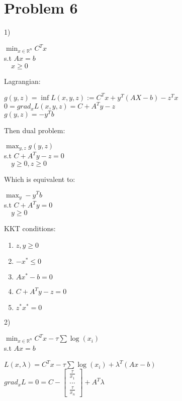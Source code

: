 \documentclass{article}
\begin{document}
\section{Problem 6}

1)
\begin{center}
$\displaystyle \min_{x\in \mathbb{R}^n} C^Tx$\\
s.t $Ax=b$\\
$\quad x \geq 0$ 
\end{center}
\vspace{5mm}
Lagrangian:
\begin{center}
$g(y,z) = \inf L(x,y,z) := C^Tx + y^T(AX-b) - z^Tx$\\
$0 = grad_x L(x,y,z) = C+A^Ty-z$\\
$g(y,z) = - y^Tb $\\
\end{center}
Then dual problem:
\begin{center}
$\displaystyle \max_{y,z} g(y,z)$\\
s.t $C+A^Ty-z=0$\\
$\quad y\geq 0, z \geq 0$
\end{center}
Which is equivalent to:
\begin{center}
$\displaystyle \max_{y} -y^Tb$\\
s.t $C+A^Ty=0$\\
$\quad y\geq 0$
\end{center}
KKT conditions:
\begin{enumerate}
\item $z,y \geq 0$
\item $-x^* \leq 0$
\item $Ax^*-b = 0$
\item $C + A^Ty-z=0$
\item $z^*x^* = 0$
\end{enumerate}


2)
\begin{center}
$\displaystyle \min_{x\in \mathbb{R}^n} C^Tx - \tau \sum \log(x_i)$\\
s.t $Ax=b$
\end{center}
\vspace{5mm}
\begin{center}
$L(x,\lambda) = C^Tx - \tau \sum \log (x_i) + \lambda^T(Ax-b)$
$grad_xL = 0 = C - \begin{bmatrix}
\frac{\tau}{x_1}\\
...\\
\frac{\tau}{x_n}
\end{bmatrix} + A^T\lambda $
\end{center}
\end{document}

